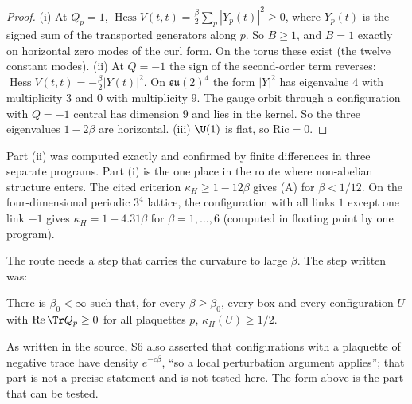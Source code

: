 \begin{proof}
(i) At $Q_p=1$, $\operatorname{Hess}V(t,t)=\frac{\beta}{2}\sum_p|Y_p(t)|^2\ge0$, where $Y_p(t)$
is the signed sum of the transported generators along $p$. So $B\ge1$, and $B=1$ exactly on
horizontal zero modes of the curl form. On the torus these exist (the twelve constant modes).
(ii) At $Q=-1$ the sign of the second-order term reverses:
$\operatorname{Hess}V(t,t)=-\frac{\beta}{2}|Y(t)|^2$. On $\mathfrak{su}(2)^4$ the form $|Y|^2$ has
eigenvalue $4$ with multiplicity $3$ and $0$ with multiplicity $9$. The gauge orbit through a
configuration with $Q=-1$ central has dimension $9$ and lies in the kernel. So the three
eigenvalues $1-2\beta$ are horizontal.
(iii) $\U(1)$ is flat, so $\mathrm{Ric}=0$.
\end{proof}

Part (ii) was computed exactly and confirmed by finite differences in three separate programs. Part (i) is the one place in the route where
non-abelian structure enters. The cited criterion $\kappa_H\ge1-12\beta$ \cite[(4.2), (4.8),
Thm.~1.4]{SZZ23} gives (A) for $\beta<1/12$. On the four-dimensional periodic $3^4$ lattice,
the configuration with all links $1$ except one link $-1$ gives $\kappa_H=1-4.31\beta$ for
$\beta=1,\dots,6$ (computed in floating point by one program).

The route needs a step that carries the curvature to large $\beta$. The step written was:

\begin{hypothesis}[Step S6]\label{neg:hyp-S6}
There is $\beta_0<\infty$ such that, for every $\beta\ge\beta_0$, every box and every configuration
$U$ with $\operatorname{Re}\Tr Q_p\ge0$ for all plaquettes $p$, $\kappa_H(U)\ge 1/2$.
\end{hypothesis}

As written in the source, S6 also asserted that configurations with a plaquette of negative trace
have density $e^{-c\beta}$, ``so a local perturbation argument applies''; that part is not a
precise statement and is not tested here. The form above is the part that can be tested.

